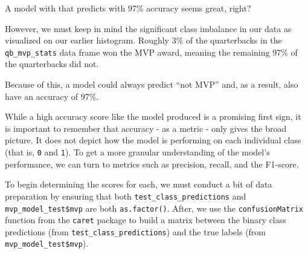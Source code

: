 \documentclass[
  letterpaper,
]{krantz}
\newenvironment{Shaded}{\begin{snugshade}}{\end{snugshade}}
\newcommand{\FunctionTok}[1]{\textcolor[rgb]{0.28,0.35,0.67}{#1}}
\newcommand{\NormalTok}[1]{\textcolor[rgb]{0.00,0.23,0.31}{#1}}
\newcommand{\OtherTok}[1]{\textcolor[rgb]{0.00,0.23,0.31}{#1}}
\newcommand{\SpecialCharTok}[1]{\textcolor[rgb]{0.37,0.37,0.37}{#1}}
\begin{document}
\begin{tcolorbox}[enhanced jigsaw, left=2mm, toprule=.15mm, opacitybacktitle=0.6, leftrule=.75mm, bottomrule=.15mm, colbacktitle=quarto-callout-important-color!10!white, breakable, colback=white, bottomtitle=1mm, toptitle=1mm, title=\textcolor{quarto-callout-important-color}{\faExclamation}\hspace{0.5em}{Important}, coltitle=black, titlerule=0mm, arc=.35mm, opacityback=0, colframe=quarto-callout-important-color-frame, rightrule=.15mm]

A model with that predicts with 97\% accuracy seems great, right?

However, we must keep in mind the significant class imbalance in our
data as visualized on our earlier histogram. Roughly 3\% of the
quarterbacks in the \texttt{qb\_mvp\_stats} data frame won the MVP
award, meaning the remaining 97\% of the quarterbacks did not.

Because of this, a model could always predict ``not MVP'' and, as a
result, also have an accuracy of 97\%.

While a high accuracy score like the model produced is a promising first
sign, it is important to remember that accuracy - as a metric - only
gives the broad picture. It does not depict how the model is performing
on each individual class (that is, \texttt{0} and \texttt{1}). To get a
more granular understanding of the model's performance, we can turn to
metrics such as precision, recall, and the F1-score.

To begin determining the scores for each, we must conduct a bit of data
preparation by ensuring that both \texttt{test\_class\_predictions} and
\texttt{mvp\_model\_test\$mvp} are both \texttt{as.factor()}. After, we
use the \texttt{confusionMatrix} function from the \texttt{caret}
package to build a matrix between the binary class predictions (from
\texttt{test\_class\_predictions}) and the true labels (from
\texttt{mvp\_model\_test\$mvp}).

\begin{Shaded}
\end{Shaded}


\end{tcolorbox}
\end{document}
